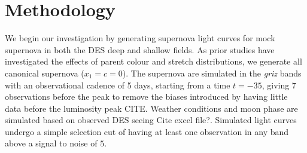 \documentclass[a4paper,fleqn,usenatbib]{mnras}
\newcommand{\red}{\color{red}}
\begin{document}
\section{Methodology}
\label{sec:methodology}

We begin our investigation by generating supernova light curves for mock supernova in both the DES deep and shallow fields. As prior studies have investigated the effects of parent colour and stretch distributions, we generate all canonical supernova ($x_1 = c = 0$). The supernova are simulated in the \textit{griz} bands with an observational cadence of 5 days, starting from a time $t = -35$, giving 7 observations before the peak to remove the biases introduced by having little data before the luminosity peak {\red CITE}. Weather conditions and moon phase are simulated based on observed DES seeing {\red Cite excel file?}. Simulated light curves undergo a simple selection cut of having at least one observation in any band above a signal to noise of $5$.
\end{document}
